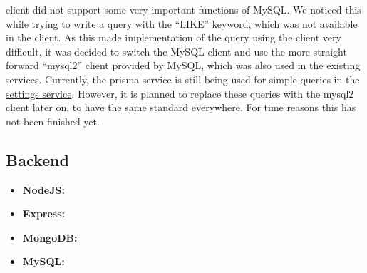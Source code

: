 \begin{itemize}
        client did not support some very important functions of MySQL.
        We noticed this while trying to write a query with the \enquote{LIKE} keyword, which was not available in the
        client.
        As this made implementation of the query using the client very difficult, it was decided to switch the MySQL
        client and use the more straight forward \enquote{mysql2} client provided by MySQL, which was also used in the
        existing services.
        Currently, the prisma service is still being used for simple queries in the
        \hyperref[subsubsec:settingsSer]{settings service}.
        However, it is planned to replace these queries with the mysql2 client later on, to have the same standard
        everywhere.
        For time reasons this has not been finished yet.
\end{itemize}

\subsection{Backend}\label{subsec:backend}

\begin{itemize}
    \item \textbf{NodeJS:} %
    \item \textbf{Express:} %
    \item \textbf{MongoDB:} %
    \item \textbf{MySQL:} %
\end{itemize}
